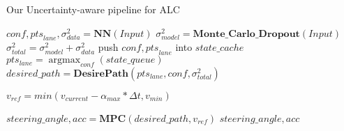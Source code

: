 \begin{algorithm}[htbp]
\caption{Our Uncertainty-aware pipeline for ALC}
\label{alg:pipeline}
\SetAlgoNoLine
\begin{algorithmic}[1]
\REQUIRE 
\STATE $conf, {pts}_{lane}, \sigma_{data}^{2} =\boldsymbol{NN}(Input)$
\STATE $\sigma_{model}^{2} = \boldsymbol{Monte\_Carlo\_Dropout}(Input)$
\STATE $\sigma_{total}^{2} =  \sigma_{model}^{2}+\sigma_{data}^{2}$
\STATE push $conf, {pts}_{lane}$ into $state\_cache$ 
    \STATE $pts_{lane} = \mathop{\arg\max}_{conf}( state\_queue)$
    \ENDIF
\STATE $desired\_path = \boldsymbol {DesirePath}(pts_{lane},conf,\sigma_{total}^{2})$

    \STATE ${v}_{ref} = min(v_{current}-\alpha_{max}*\Delta t, {v}_{min})$
    \ENDIF

\STATE $steering\_angle, acc = \boldsymbol{MPC}(desired\_path, v_{ref})$
\RETURN $steering\_angle, acc$
\end{algorithmic}
\end{algorithm}